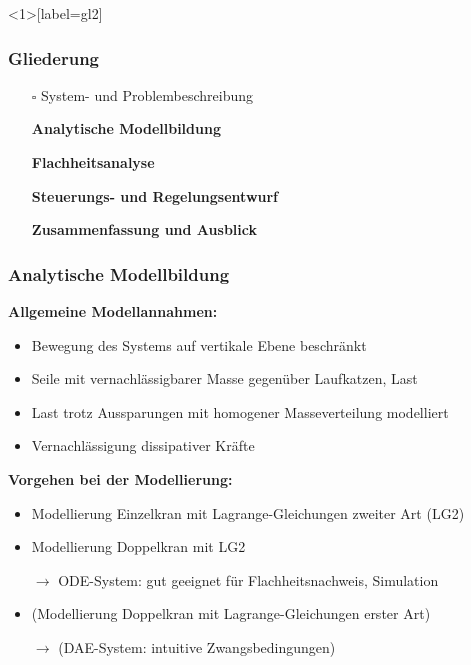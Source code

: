 \documentclass[
	ngerman,
	10pt,				%
	aspectratio=169 	%
]{beamer}
\newcommand{\cdbox}{$\square$\hspace{-0.65em}\raisebox{0.1em}{\checkmark}\hspace{-0.18em}}
\begin{document}

\begin{frame}<1>[label=gl2]
	\frametitle{Gliederung}
	\begin{itemize}
		\item[\cdbox] System- und Problembeschreibung
		\item[\only<1>{$\rightarrow$}\only<2>{$\rightarrow$}\only<3->{\cdbox}]
		\textbf<1>{Analytische Modellbildung}
		\item[\only<1>{$\square$}\only<2>{$\rightarrow$}\only<3->{\cdbox}]
		\textbf<2>{Flachheitsanalyse}
		\item[\only<1-2>{$\square$}\only<3>{$\rightarrow$}\only<4->{\cdbox}]
		\textbf<3>{Steuerungs- und Regelungsentwurf}
		\item[\only<1-2>{$\square$}\only<3>{$\rightarrow$}\only<4->{\cdbox}]
		\textbf<3>{Zusammenfassung und Ausblick}
	\end{itemize}
\end{frame}


\begin{frame}[label=analMB]
	\frametitle{Analytische Modellbildung}
	\textbf{Allgemeine Modellannahmen:}
	\begin{itemize}
		\item Bewegung des Systems auf vertikale Ebene beschränkt
		\pause
		\item Seile mit vernachlässigbarer Masse gegenüber Laufkatzen, Last
		\pause
		\item Last trotz Aussparungen mit homogener Masseverteilung modelliert
		\pause
		\item Vernachlässigung dissipativer Kräfte 
	\end{itemize}

	\pause
	\bigskip
	\textbf{Vorgehen bei der Modellierung:}
	\begin{itemize}
		\item Modellierung Einzelkran mit Lagrange-Gleichungen zweiter Art (LG2)
		\pause
		\item Modellierung Doppelkran mit LG2
		\pause
		\item[$\rightarrow$] ODE-System: gut geeignet für Flachheitsnachweis, Simulation 
		\pause
		\item (Modellierung Doppelkran mit Lagrange-Gleichungen erster Art)
		\item[$\rightarrow$] (DAE-System: intuitive Zwangsbedingungen)
	\end{itemize}
\end{frame}
\end{document}
